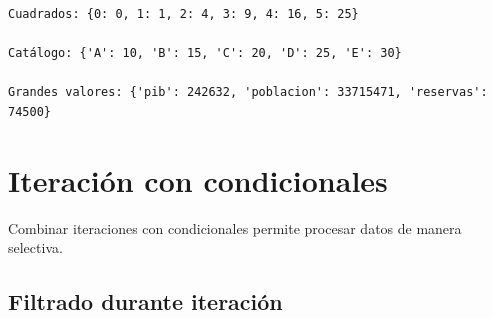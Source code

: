 \documentclass[
  doc,
  floatsintext,
  longtable,
  a4paper,
  nolmodern,
  notxfonts,
  notimes,
  12pt,
  colorlinks=true,linkcolor=blue,citecolor=blue,urlcolor=blue]{apa7}
\begin{document}
\begin{verbatim}
Cuadrados: {0: 0, 1: 1, 2: 4, 3: 9, 4: 16, 5: 25}

Catálogo: {'A': 10, 'B': 15, 'C': 20, 'D': 25, 'E': 30}

Grandes valores: {'pib': 242632, 'poblacion': 33715471, 'reservas': 74500}
\end{verbatim}

\section{Iteración con
condicionales}\label{iteraciuxf3n-con-condicionales}

Combinar iteraciones con condicionales permite procesar datos de manera
selectiva.

\subsection{Filtrado durante
iteración}\label{filtrado-durante-iteraciuxf3n}
\end{document}

